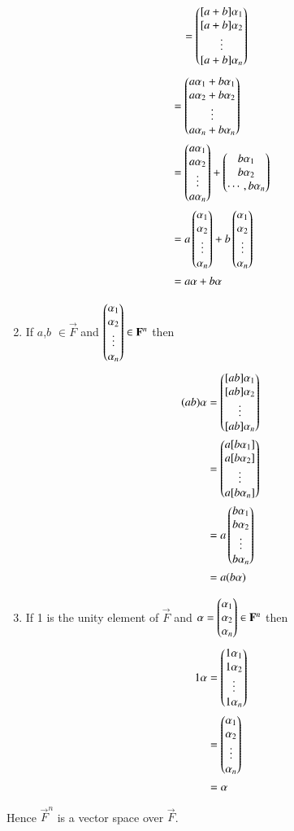 \documentclass[journal,12pt,twocolumn]{IEEEtran}
\begin{document}
\begin{enumerate}
\begin{align}
	&=\begin{pmatrix}[a+b]\alpha_1\\ [a+b]\alpha_2\\ \vdots\\ [a+b]\alpha_n\end{pmatrix} 
\end{align}
\begin{align}
	&=\begin{pmatrix}a\alpha_1+b\alpha_1\\ a\alpha_2+b\alpha_2\\ \vdots\\
		a\alpha_n+b\alpha_n\end{pmatrix} \\ 
	&=\begin{pmatrix}a\alpha_1\\ a\alpha_2\\ \vdots\\ a\alpha_n\end{pmatrix}+
		\begin{pmatrix}b\alpha_1\\ b\alpha_2\\ \cdots,b\alpha_n\end{pmatrix} \\
	&=a\begin{pmatrix}\alpha_1\\ \alpha_2\\ \vdots\\ \alpha_n\end{pmatrix}+
		b\begin{pmatrix}\alpha_1\\ \alpha_2\\ \vdots\\ \alpha_n\end{pmatrix} \\
	&=a\alpha+b\alpha
\end{align}
\item If $a$,$b$ $\in \vec{F}$ and 
	$\begin{pmatrix}\alpha_1\\ \alpha_2\\ \vdots\\ \alpha_n\end{pmatrix} \in \mathbf{F}^n$ 
then
\begin{align}
     (ab)\alpha&=\begin{pmatrix}[ab]\alpha_1\\ [ab]\alpha_2\\ \vdots\\ [ab]\alpha_n\end{pmatrix} \\
	  &=\begin{pmatrix}a[b\alpha_1]\\ a[b\alpha_2]\\ \vdots\\ a[b\alpha_n]\end{pmatrix} \\
	  &=a\begin{pmatrix}b\alpha_1\\ b\alpha_2\\ \vdots\\ b\alpha_n\end{pmatrix} \\
	  &=a(b\alpha)
\end{align}
\item If 1 is the unity element of $\vec{F}$ and 
	$\alpha=\begin{pmatrix}\alpha_1\\ \alpha_2\\ \alpha_n\end{pmatrix} \in \mathbf{F}^n$ then
\begin{align}
	1\alpha &=\begin{pmatrix}1\alpha_1\\ 1\alpha_2\\ \vdots\\ 1\alpha_n\end{pmatrix} \\
		&=\begin{pmatrix}\alpha_1\\ \alpha_2\\ \vdots\\ \alpha_n\end{pmatrix} \\
		&= \alpha
\end{align}
\end{enumerate}
Hence $\vec{F}^n$ is a vector space over $\vec{F}$.
\end{document}
